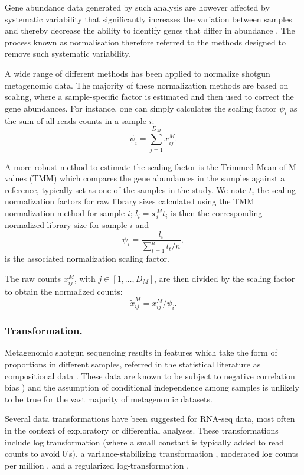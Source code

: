 \documentclass[]{book}
\begin{document}
Gene abundance data generated by such analysis are however affected by
systematic variability that significantly increases the variation
between samples and thereby decrease the ability to identify genes that
differ in abundance
\citep{jonsson2017variability, wooley2010primer, pereira2018comparison}.
The process known as normalisation therefore referred to the methods
designed to remove such systematic variability.

A wide range of different methods has been applied to normalize shotgun
metagenomic data. The majority of these normalization methods are based
on scaling, where a sample-specific factor is estimated and then used to
correct the gene abundances. For instance, one can simply calculates the
scaling factor \(\psi_i\) as the sum of all reads counts in a sample \(i\):
\[\psi_i = \sum_{j=1}^{D_{\mathit{M}}} x_{ij}^{\mathit{M}}.\]

A more robust method to estimate the scaling factor is the Trimmed Mean
of M-values (TMM) \citep{robinson2010scaling} which compares the gene
abundances in the samples against a reference, typically set as one of
the samples in the study. We note \(t_i\) the scaling normalization
factors for raw library sizes calculated using the TMM normalization
method for sample \(i\); \(l_i = \mathbf{x}_i^{\mathit{M}} t_i\) is then the corresponding
normalized library size for sample \(i\) and
\[\psi_i = \frac{l_i}{\sum_{t=1}^n l_t/n},\] is the associated
normalization scaling factor.

The raw counts \(x_{ij}^{\mathit{M}}\), with \(j \in [1, \dots, D_{\mathit{M}}]\), are
then divided by the scaling factor to obtain the normalized counts:
\[\tilde{x}_{ij}^{\mathit{M}} = x_{ij}^{\mathit{M}}/\psi_i .\]

\hypertarget{transformation.}{%
\subsubsection{Transformation.}\label{transformation.}}

Metagenomic shotgun sequencing results in features which take the form
of proportions in different samples, referred in the statistical
literature as compositional data \citep{Aitchison:JRSSB82}. These data are
known to be subject to negative correlation bias
\citep{Pearson:RSL1896, Aitchison:JRSSB82}) and the assumption of
conditional independence among samples is unlikely to be true for the
vast majority of metagenomic datasets.

Several data transformations have been suggested for RNA-seq data, most
often in the context of exploratory or differential analyses. These
transformations include log transformation (where a small constant is
typically added to read counts to avoid 0's), a variance-stabilizing
transformation \citep{tibshirani1988estimating, huber2003parameter},
moderated log counts per million \citep{law2014voom}, and a regularized
log-transformation \citep{love2014moderated}.
\end{document}
